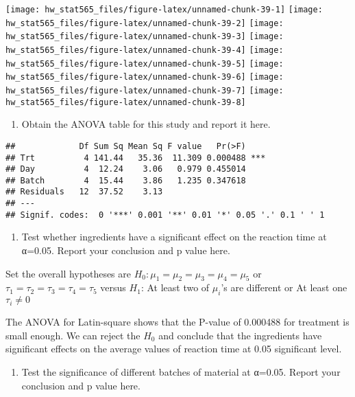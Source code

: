 \documentclass[]{article}
\providecommand{\tightlist}{%
  \setlength{\itemsep}{0pt}\setlength{\parskip}{0pt}}
\begin{document}
\texttt{[image: hw\_stat565\_files/figure-latex/unnamed-chunk-39-1]}
\texttt{[image: hw\_stat565\_files/figure-latex/unnamed-chunk-39-2]}
\texttt{[image: hw\_stat565\_files/figure-latex/unnamed-chunk-39-3]}
\texttt{[image: hw\_stat565\_files/figure-latex/unnamed-chunk-39-4]}
\texttt{[image: hw\_stat565\_files/figure-latex/unnamed-chunk-39-5]}
\texttt{[image: hw\_stat565\_files/figure-latex/unnamed-chunk-39-6]}
\texttt{[image: hw\_stat565\_files/figure-latex/unnamed-chunk-39-7]}
\texttt{[image: hw\_stat565\_files/figure-latex/unnamed-chunk-39-8]}

\begin{enumerate}
\def\labelenumi{(\alph{enumi})}
\setcounter{enumi}{1}
\tightlist
\item
  Obtain the ANOVA table for this study and report it here.
\end{enumerate}

\begin{verbatim}
##             Df Sum Sq Mean Sq F value   Pr(>F)    
## Trt          4 141.44   35.36  11.309 0.000488 ***
## Day          4  12.24    3.06   0.979 0.455014    
## Batch        4  15.44    3.86   1.235 0.347618    
## Residuals   12  37.52    3.13                     
## ---
## Signif. codes:  0 '***' 0.001 '**' 0.01 '*' 0.05 '.' 0.1 ' ' 1
\end{verbatim}

\begin{enumerate}
\def\labelenumi{(\alph{enumi})}
\setcounter{enumi}{2}
\tightlist
\item
  Test whether ingredients have a significant effect on the reaction
  time at α=0.05. Report your conclusion and p value here.
\end{enumerate}

Set the overall hypotheses are \(H_0: \mu_1=\mu_2=\mu_3=\mu_4=\mu_5\) or
\(\tau_1=\tau_2=\tau_3=\tau_4=\tau_5\) versus \(H_1\): At least two of
\(\mu_i\)'s are different or At least one \(\tau_i\neq0\)

The ANOVA for Latin-square shows that the P-value of 0.000488 for
treatment is small enough. We can reject the \(H_0\) and conclude that
the ingredients have significant effects on the average values of
reaction time at 0.05 significant level.

\begin{enumerate}
\def\labelenumi{(\alph{enumi})}
\setcounter{enumi}{3}
\tightlist
\item
  Test the significance of different batches of material at α=0.05.
  Report your conclusion and p value here.
\end{enumerate}
\end{document}
